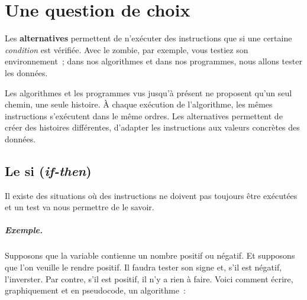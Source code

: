 \chapter{Une question de choix}

	
	Les \textbf{alternatives} permettent de n’exécuter des
	instructions que si une certaine \emph{condition} est vérifiée.  Avec le
	zombie, par exemple, vous testiez son environnement~; dans nos algorithmes
	et dans nos programmes, nous allons tester les données.
	
	Les algorithmes et les programmes vus jusqu’à présent ne proposent qu’un
	seul \og{}chemin\fg{}, une seule \og{}histoire\fg{}.  À chaque exécution de
	l’algorithme, les mêmes instructions s’exécutent dans le même ordres.  Les
	alternatives permettent de créer des histoires différentes, d’adapter les
	instructions aux valeurs concrètes des données.  

	\minitoc 

\section{Le si (\textit{if-then})}
		
	Il existe des situations où des instructions ne doivent pas toujours être
	exécutées et un test va nous permettre de le savoir.
	
	\paragraph{Exemple.}

	Supposons que la variable  contienne un nombre positif ou négatif.
	Et supposons que l’on veuille le rendre positif. Il faudra tester son signe
	et, s’il est négatif, l'inverster.  Par contre, s’il est positif, il n’y
	a rien à faire.  Voici comment écrire, graphiquement et en pseudocode, un 
	algorithme~:
	
